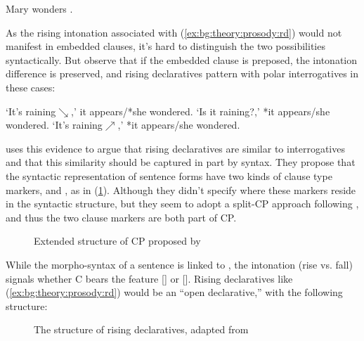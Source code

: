 Mary wonders .
\eex

As the rising intonation associated with (\ref{ex:bg:theory:prosody:rd}) would not manifest in embedded clauses, it's hard to distinguish the two possibilities syntactically. But \textcite{farkasroelofsen2017} observe that if the embedded clause is preposed, the intonation difference is preserved, and rising declaratives pattern with polar interrogatives in these cases:

\bxl{}
`It's raining$\searrow$,' it appears/*she wondered.
\ex`Is it raining?,' *it appears/she wondered.
\ex`It's raining$\nearrow$,' *it appears/she wondered.
\exl
\eex

\textcite{farkasroelofsen2017} uses this evidence to argue that rising declaratives are similar to interrogatives and that this similarity should be captured in part by syntax.%
They propose that the syntactic representation of sentence forms have two kinds of clause type markers,  and , as in (\ref{fig:bg:fb2017}). Although they didn't specify where these markers reside in the syntactic structure, but they seem to adopt a split-CP approach following \textcite{rizzi1997}, and thus the two clause markers are both part of CP. 


\begin{figure}[H]
\begin{center}
\end{center}
\caption{Extended structure of CP proposed by \textcite{farkasroelofsen2017}}
\label{fig:bg:fb2017}
\end{figure}

While the morpho-syntax of a sentence is linked to , the intonation (rise vs. fall) signals whether C bears the feature [] or []. Rising declaratives like (\ref{ex:bg:theory:prosody:rd}) would be an ``open declarative,'' with the following structure:

\begin{figure}[H]
\begin{center}
\end{center}
\caption{The structure of rising declaratives, adapted from \textcite{farkasroelofsen2017}}
\label{fig:bg:fb2017rd}
\end{figure}

